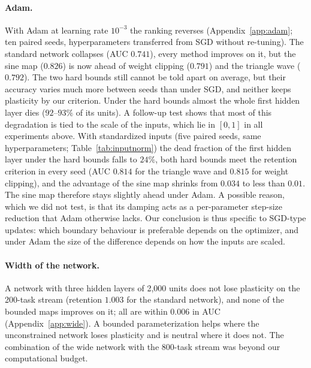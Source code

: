 \documentclass[11pt,a4paper]{article}
\begin{document}
\paragraph{Adam.} With Adam at learning rate $10^{-3}$ the ranking reverses (Appendix~\ref{app:adam}; ten
paired seeds, hyperparameters transferred from SGD without re-tuning). The standard network collapses (AUC
$0.741$), every method improves on it, but the sine map ($0.826$) is now ahead of weight clipping ($0.791$)
and the triangle wave ($0.792$). The two hard bounds still cannot be told apart on average, but their accuracy
varies much more between seeds than under SGD, and neither keeps plasticity by our criterion. Under the
hard bounds almost the whole first hidden layer dies ($92$--$93\%$ of its units). A follow-up test shows
that most of this degradation is tied to the scale of the inputs, which lie in $[0,1]$ in all experiments
above. With standardized inputs (five paired seeds, same hyperparameters; Table~\ref{tab:inputnorm}) the
dead fraction of the first hidden layer under the hard bounds falls to $24\%$, both hard bounds meet the
retention criterion in every seed (AUC $0.814$ for the triangle wave and $0.815$ for weight clipping), and the
advantage of the sine map shrinks from $0.034$ to less than $0.01$. The sine map therefore stays slightly
ahead under Adam. A possible reason, which we did not test, is that its damping acts as a per-parameter
step-size reduction that Adam otherwise lacks. Our conclusion is thus specific to SGD-type updates: which
boundary behaviour is preferable depends on the optimizer, and under Adam the size of the difference depends on
how the inputs are scaled.

\paragraph{Width of the network.} A network with three hidden layers of 2{,}000 units does not lose plasticity
on the 200-task stream (retention $1.003$ for the standard network), and none of the bounded maps improves on
it; all are within $0.006$ in AUC (Appendix~\ref{app:wide}). A bounded parameterization helps where the
unconstrained network loses plasticity and is neutral where it does not. The combination of the wide network
with the 800-task stream was beyond our computational budget.
\end{document}
